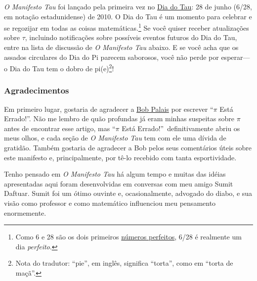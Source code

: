 \emph{O Manifesto Tau} foi lançado pela primeira vez no \href{https://tauday.com/}{Dia do Tau}: 28 de junho (6/28, em notação estadunidense) de 2010. O Dia do Tau é um momento para celebrar e se regozijar em todas as coisas matemáticas.\footnote{Como 6 e 28 são os dois primeiros \href{https://pt.wikipedia.org/wiki/N%C3%BAmero_perfeito}{números perfeitos}, 6/28 é realmente um dia \emph{perfeito}.} Se você quiser receber atualizações sobre $\tau$, incluindo notificações sobre possíveis eventos futuros do Dia do Tau, entre na lista de discussão de \emph{O Manifesto Tau} abaixo. E se você acha que os assados ​​circulares do Dia do Pi parecem saborosos, você não perde por esperar---o Dia do Tau tem o dobro de pi(e)\footnote{Nota do tradutor: ``pie'', em inglês, significa ``torta'', como em ``torta de maçã''.}!


  \subsubsection{Agradecimentos} %
  \label{sec:acknowledgments}

Em primeiro lugar, gostaria de agradecer a \href{https://www.math.utah.edu/~palais}{Bob Palais} por escrever ``$\pi$ Está Errado!''. Não me lembro de quão profundas já eram minhas suspeitas sobre $\pi$ antes de encontrar esse artigo, mas ``$\pi$ Está Errado!''\ definitivamente abriu os meus olhos, e cada seção de \emph{O Manifesto Tau} tem com ele uma dívida de gratidão. Também gostaria de agradecer a Bob pelos seus comentários úteis sobre este manifesto e, principalmente, por tê-lo recebido com tanta esportividade.

Tenho pensado em \emph{O Manifesto Tau} há algum tempo e muitas das idéias apresentadas aqui foram desenvolvidas em conversas com meu amigo Sumit Daftuar. Sumit foi um ótimo ouvinte e, ocasionalmente, advogado do diabo, e sua visão como professor e como matemático influenciou meu pensamento enormemente.

